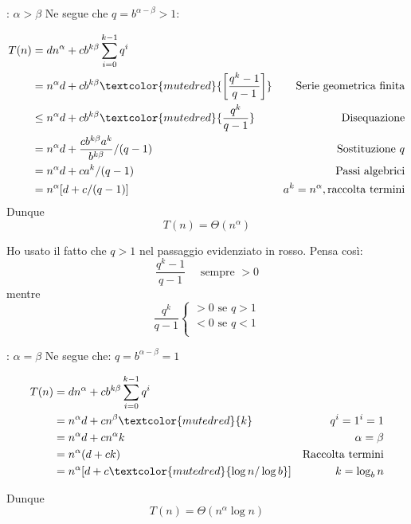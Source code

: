 \begin{tcolorbox}
	: $ \alpha > \beta $
	\tcblower
	\vskip3mm
	Ne segue che $q = b^{\alpha-\beta} > 1:$

	\begin{align*}
		T(n) & = dn^{\alpha} + cb^{k\beta} \sum_{i=0}^{k-1} q^i                                    &                                           \\
		     & = n^{\alpha}d + cb^{k\beta}\textcolor{mutedred}{\left[\frac{q^k - 1}{q - 1}\right]} & \text{Serie geometrica finita}            \\
		     & \leq n^{\alpha}d + cb^{k\beta}\textcolor{mutedred}{\frac{q^k}{q - 1}}               & \text{Disequazione}                       \\
		     & = n^{\alpha}d + \frac{cb^{k\beta}a^k}{b^{k\beta}}/(q - 1)                           & \text{Sostituzione } q                    \\
		     & = n^{\alpha}d + ca^k/(q - 1)                                                        & \text{Passi algebrici}                    \\
		     & = n^{\alpha}[d + c/(q - 1)]                                                         & a^k = n^{\alpha}, \text{raccolta termini}
	\end{align*}
	Dunque
	\[
		T(n) = \Theta (n^{\alpha})
	\]
\end{tcolorbox}
\vskip3mm
Ho usato il fatto che $ q > 1 $ nel passaggio evidenziato in rosso. Pensa così:
\[
	\frac{q^{k}-1}{q-1} \quad  \text{ sempre } > 0
\]
mentre
\[
	\frac{q^{k}}{q-1}
	\begin{cases}
		> 0 \text{ se }  q > 1 \\
		< 0 \text{ se }  q < 1 \\
	\end{cases}
\]


\vskip3mm

\begin{tcolorbox}
	: $ \alpha = \beta $
	\tcblower
	Ne segue che:  $q = b^{\alpha-\beta} = 1$

	\begin{align*}
		T(n) & = dn^{\alpha} + cb^{k\beta} \sum_{i=0}^{k-1} q^i                                   \\
		     & = n^{\alpha}d + cn^{\beta} \textcolor{mutedred}{k}       & q^i = 1^i = 1           \\
		     & = n^{\alpha}d + cn^{\alpha}k                             & \alpha = \beta          \\
		     & = n^{\alpha}(d + ck)                                     & \text{Raccolta termini} \\
		     & = n^{\alpha}[d + c\textcolor{mutedred}{\log n / \log b}] & k = \log_b n
	\end{align*}

	Dunque
	\[
		T(n) = \Theta(n^{\alpha} \log n)
	\]

	\vskip3mm

\end{tcolorbox}

